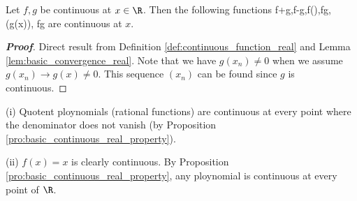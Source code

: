 


\begin{proposition}\label{pro:basic_continuous_real_property}%
Let $f,g$ be continuous at $x\in \R$. Then the following functions
\be
f+g,\qquad f-g,\qquad \lm f\quad(\lm\in \R),\qquad  fg,\qquad {}\quad(g(x)), \qquad f\circ g
\ee
are continuous at $x$.
\end{proposition}


\begin{proof}[\bf Proof]
Direct result from Definition \ref{def:continuous_function_real} and Lemma \ref{lem:basic_convergence_real}. Note that we have $g(x_n)\neq 0$ when we assume $g(x_n) \to g(x)\neq 0$. This sequence $(x_n)$ can be found since $g$ is continuous.
\end{proof}

\begin{example}
\ben
\item [(i)] Quotent ploynomials (rational functions) are continuous at every point where the denominator does not vanish (by Proposition \ref{pro:basic_continuous_real_property}).
\item [(ii)] $f(x)=x$ is clearly continuous. By Proposition \ref{pro:basic_continuous_real_property}, any ploynomial is continuous at every point of $\R$.
\een
\end{example}



